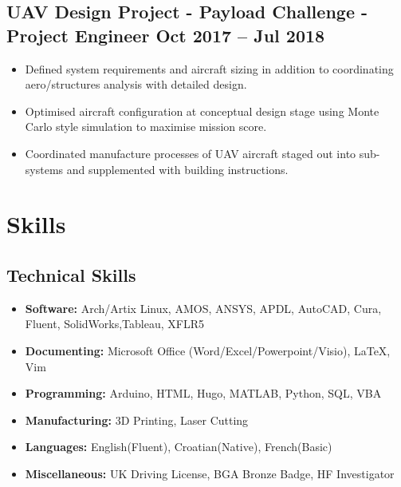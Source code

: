 \documentclass[a4paper,9pt]{article}
\begin{document}
\subsection*{\textbf{UAV Design Project - Payload Challenge - Project Engineer } \hfill  Oct 2017 – Jul 2018}

\begin{itemize}[noitemsep]
	\item Defined system requirements and aircraft sizing in addition to coordinating aero/structures analysis with detailed design.
	\item Optimised aircraft configuration at conceptual design stage using Monte Carlo style simulation to maximise mission score.
	\item Coordinated manufacture processes of UAV aircraft staged out into sub-systems and supplemented with building instructions.

\end{itemize}
%
%
%

\section*{Skills}
\subsection*{Technical Skills}
\begin{itemize}[noitemsep]
    \item \textbf{Software:} Arch/Artix Linux, AMOS, ANSYS, APDL, AutoCAD, Cura, Fluent, SolidWorks,Tableau, XFLR5
    \item \textbf{Documenting:}  Microsoft Office (Word/Excel/Powerpoint/Visio), LaTeX, Vim
    \item \textbf{Programming:}  Arduino, HTML, Hugo, MATLAB, Python, SQL, VBA
    \item \textbf{Manufacturing:} 3D Printing, Laser Cutting
    \item \textbf{Languages:} English(Fluent), Croatian(Native), French(Basic)
    \item \textbf{Miscellaneous:} UK Driving License, BGA Bronze Badge, HF Investigator
\end{itemize}



\date{}
\end{document}
